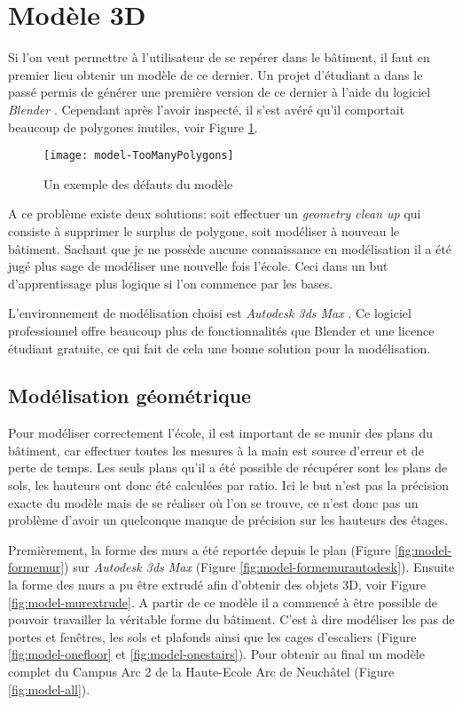 \section{Modèle 3D}
Si l'on veut permettre à l'utilisateur de se repérer dans le bâtiment, il faut en premier lieu obtenir un modèle de ce dernier. Un projet d'étudiant a dans le passé permis de générer une première version de ce dernier à l'aide du logiciel \emph{Blender} \cite{blender-website}. Cependant  après l'avoir inspecté, il s'est avéré qu'il comportait beaucoup de polygones inutiles, voir Figure \ref{fig:model-toomanypolygons}.

\begin{figure}[h!]
	\centering
	\texttt{[image: model-TooManyPolygons]}
	\caption{Un exemple des défauts du modèle}
	\label{fig:model-toomanypolygons}
\end{figure}

A ce problème existe deux solutions: soit effectuer un \textit{geometry clean up} qui consiste à supprimer le surplus de polygone, soit modéliser à nouveau le bâtiment. Sachant que je ne possède aucune connaissance en modélisation il a été jugé plus sage de modéliser une nouvelle fois l'école. Ceci dans un but d'apprentissage plus logique si l'on commence par les bases.

L'environnement de modélisation choisi est \emph{Autodesk 3ds Max} \cite{autodesk-3dsmax}. Ce logiciel professionnel offre beaucoup plus de fonctionnalités que Blender et une licence étudiant gratuite, ce qui fait de cela une bonne solution pour la modélisation.


\subsection{Modélisation géométrique}
Pour modéliser correctement l'école, il est important de se munir des plans du bâtiment, car effectuer toutes les mesures à la main est source d'erreur et de perte de temps. Les seuls plans qu'il a été possible de récupérer sont les plans de sols, les hauteurs ont donc été calculées par ratio. Ici le but n'est pas la précision exacte du modèle mais de se réaliser où l'on se trouve, ce n'est donc pas un problème d'avoir un quelconque manque de précision sur les hauteurs des étages.

Premièrement, la forme des murs a été reportée depuis le plan (Figure \ref{fig:model-formemur}) sur \textit{Autodesk 3ds Max} (Figure \ref{fig:model-formemurautodesk}). Ensuite la forme des murs a pu être extrudé afin d'obtenir des objets 3D, voir Figure \ref{fig:model-murextrude}. A partir de ce modèle il a commencé à être possible de pouvoir travailler la véritable forme du bâtiment. C'est à dire modéliser les pas de portes et fenêtres, les sols et plafonds ainsi que les cages d'escaliers (Figure \ref{fig:model-onefloor} et \ref{fig:model-onestairs}). Pour obtenir au final un modèle complet du Campus Arc 2 de la Haute-Ecole Arc de Neuchâtel (Figure \ref{fig:model-all}).


